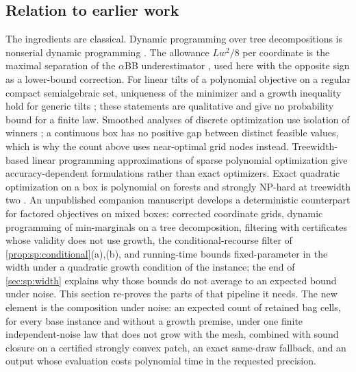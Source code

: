 \subsection{Relation to earlier work}\label{sec:sp:prior}

The ingredients are classical. Dynamic programming over tree decompositions
is nonserial dynamic programming \citep{bertele1972-nonserial-dynamic-programming}. The allowance
$Lw^2/8$ per coordinate is the maximal separation of the
$\alpha$BB underestimator \citep{adjiman1998-a-global-optimization-method-bb}, used here with the
opposite sign as a lower-bound correction. For linear tilts of a polynomial
objective on a regular compact semialgebraic set, uniqueness of the
minimizer and a growth inequality hold for generic tilts
\citep{lee2017-generic-properties-for-semialgebraic-programs}; these
statements are qualitative and give no probability bound for a finite law. Smoothed analyses of discrete optimization use isolation of winners
\citep{beier2006-typical-properties-of-winners-and,roglin2007-smoothed-analysis-of-integer-programming}; a continuous box has no
positive gap between distinct feasible values, which is why the count above
uses near-optimal grid nodes instead. Treewidth-based linear programming
approximations of sparse polynomial optimization \citep{bienstock2018-lp-formulations-for-polynomial-optimization}
give accuracy-dependent formulations rather than exact optimizers. Exact
quadratic optimization on a box is polynomial on forests and strongly
NP-hard at treewidth two \citep{pia2026-treewidth-and-the-complexity-of}.
An unpublished companion manuscript \citep{companion-decomposition-aware}
develops a deterministic counterpart for factored objectives on mixed boxes:
corrected coordinate grids, dynamic programming of min-marginals on a tree
decomposition, filtering with certificates whose validity does not use
growth, the conditional-recourse filter of \cref{prop:sp:conditional}(a),(b),
and running-time bounds fixed-parameter in the width under a quadratic
growth condition of the instance; the end of \cref{sec:sp:width} explains
why those bounds do not average to an expected bound under noise. This
section re-proves the parts of that pipeline it needs. The new element
is the composition under noise: an expected count of retained bag cells,
for every base instance and without a growth premise, under one finite
independent-noise law that does not grow with the mesh, combined with sound
closure on a certified strongly convex patch, an exact same-draw fallback,
and an output whose evaluation costs polynomial time in the requested
precision.
